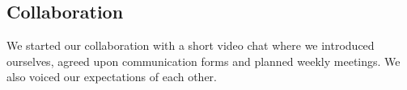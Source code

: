 \subsection{Collaboration}
We started our collaboration with a short video chat where we introduced ourselves, agreed upon communication forms and planned weekly meetings. We also voiced our expectations of each other.



\newpage